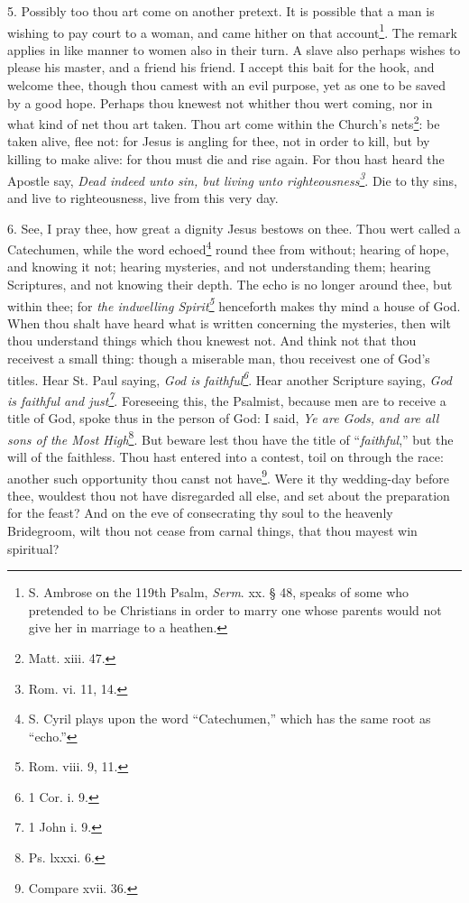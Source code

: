 5. Possibly too thou art come on another pretext. It is possible that a man is wishing to pay court to a woman, and came hither on that account\footnote{S. Ambrose on the 119th Psalm, \emph{Serm}. xx. § 48, speaks of some who pretended to be Christians in order to marry one whose parents would not give her in marriage to a heathen.}. The remark applies in like manner to women also in their turn. A slave also perhaps wishes to please his master, and a friend his friend. I accept this bait for the hook, and welcome thee, though thou camest with an evil purpose, yet as one to be saved by a good hope. Perhaps thou knewest not whither thou wert coming, nor in what kind of net thou art taken. Thou art come within the Church’s nets\footnote{Matt. xiii. 47.}: be taken alive, flee not: for Jesus is angling for thee, not in order to kill, but by killing to make alive: for thou must die and rise again. For thou hast heard the Apostle say, \emph{Dead indeed unto sin, but living unto righteousness\footnote{Rom. vi. 11, 14.}}. Die to thy sins, and live to righteousness, live from this very day.

6. See, I pray thee, how great a dignity Jesus bestows on thee. Thou wert called a Catechumen, while the word echoed\footnote{S. Cyril plays upon the word “Catechumen,” which has the same root as “echo.”} round thee from without; hearing of hope, and knowing it not; hearing mysteries, and not understanding them; hearing Scriptures, and not knowing their depth. The echo is no longer around thee, but within thee; for \emph{the indwelling Spirit\footnote{Rom. viii. 9, 11.}} henceforth makes thy mind a house of God. When thou shalt have heard what is written concerning the mysteries, then wilt thou understand things which thou knewest not. And think not that thou receivest a small thing: though a miserable man, thou receivest one of God’s titles. Hear St. Paul saying, \emph{God is faithful\footnote{1 Cor. i. 9.}}. Hear another Scripture saying, \emph{God is faithful and just\footnote{1 John i. 9.}}. Foreseeing this, the Psalmist, because men are to receive a title of God, spoke thus in the person of God: I said, \emph{Ye are Gods, and are all sons of the Most High}\footnote{Ps. lxxxi. 6.}. But beware lest thou have the title of “\emph{faithful},” but the will of the faithless. Thou hast entered into a contest, toil on through the race: another such opportunity thou canst not have\footnote{Compare xvii. 36.}. Were it thy wedding-day before thee, wouldest thou not have disregarded all else, and set about the preparation for the feast? And on the eve of consecrating thy soul to the heavenly Bridegroom, wilt thou not cease from carnal things, that thou mayest win spiritual?

